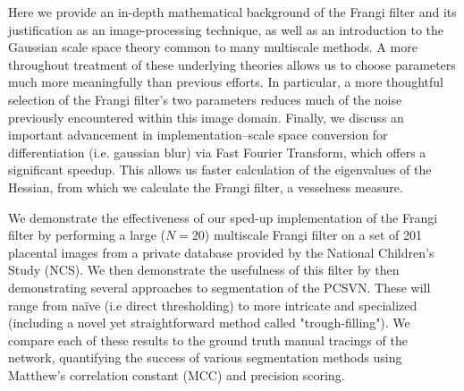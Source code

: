Here we provide an in-depth mathematical background of the Frangi filter and
its justification as an image-processing technique, as well as an introduction
to the Gaussian scale space theory common to many multiscale methods. A more throughout
treatment of these underlying theories allows us to choose parameters much more meaningfully than previous efforts. In particular, a more thoughtful selection of the Frangi filter's two parameters reduces much of the noise previously encountered within this image domain.  Finally,
we discuss an important advancement in implementation--scale space conversion
for differentiation (i.e. gaussian blur) via Fast Fourier Transform, which
offers a significant speedup. This allows us faster calculation of the
eigenvalues of the Hessian, from which we calculate the Frangi filter, a
vesselness measure.

We demonstrate the effectiveness of our sped-up implementation of the Frangi
filter by performing a large ($N=20$) multiscale Frangi filter on a set of 201
placental images from a private database provided by the National Children's
Study (NCS). We then demonstrate the usefulness of this filter by
then demonstrating several approaches to segmentation
of the PCSVN. These will range from na\"{i}ve (i.e direct thresholding) to more intricate and specialized (including a novel yet straightforward method called "trough-filling"). We compare each of these results to
the ground truth manual tracings of the network, quantifying the success of various segmentation methods using Matthew's correlation constant (MCC) and precision scoring.